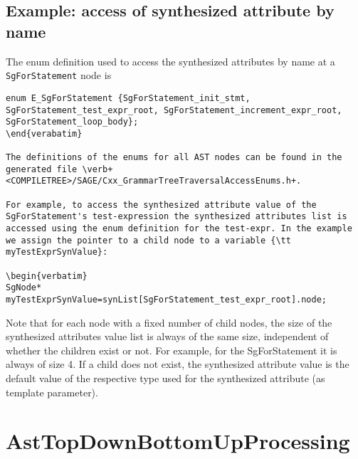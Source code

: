 
\subsection{Example: access of synthesized attribute by name}

The enum definition used to access the synthesized attributes by name at a {\tt SgForStatement} node is

\begin{verbatim}
enum E_SgForStatement {SgForStatement_init_stmt, SgForStatement_test_expr_root, SgForStatement_increment_expr_root, SgForStatement_loop_body};
\end{verabatim}

The definitions of the enums for all AST nodes can be found in the generated file \verb+<COMPILETREE>/SAGE/Cxx_GrammarTreeTraversalAccessEnums.h+.

For example, to access the synthesized attribute value of the SgForStatement's test-expression the synthesized attributes list is accessed using the enum definition for the test-expr. In the example we assign the pointer to a child node to a variable {\tt myTestExprSynValue}:

\begin{verbatim}
SgNode* myTestExprSynValue=synList[SgForStatement_test_expr_root].node;
\end{verbatim}

Note that for each node with a fixed number of child nodes, the size of the synthesized attributes value list is always of the same size, independent of whether the children exist or not. For example, for the SgForStatement it is always of size 4. If a child does not exist, the synthesized attribute value is the default value of the respective type used for the synthesized attribute (as template parameter).

\section{AstTopDownBottomUpProcessing}
\label{AstProcessing:AstTopDownBottomUpProcessing}

